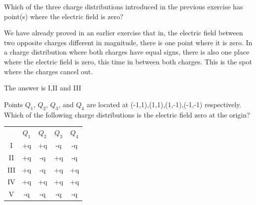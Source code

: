 
\begin{question}
Which of the three charge distributions introduced in the previous exercise has point(s) where the electric field is zero?
\end{question}

\begin{solution}
We have already proved in an earlier exercise that in, the electric field between two opposite charges different in magnitude, there is one point where it is zero. In a charge distribution where both charges have equal signs, there is also one place where the electric field is zero, this time in between both charges. This is the spot where the charges cancel out.

The answer is I,II and III
\end{solution}


\begin{question}
Points $Q_1$, $Q_2$, $Q_3$, and $Q_4$ are located at (-1,1),(1,1),(1,-1),(-1,-1) respectively. Which of the following charge distributions is the electric field zero at the origin?

\begin{center}
\begin{tabular}{ |c|c|c|c|c| } 
 \hline
       & $Q_1$ & $Q_2$ & $Q_3$ & $Q_4$ \\ 
 I        & +q  & +q & -q & -q  \\ 
 II       & +q  & -q & +q & -q  \\ 
 III      & +q  & -q & +q & +q  \\ 
 IV       & +q  & +q & +q & +q  \\ 
 V        & -q  & -q & -q & -q  \\ 
 \hline
\end{tabular}
\end{center}

\end{question}

